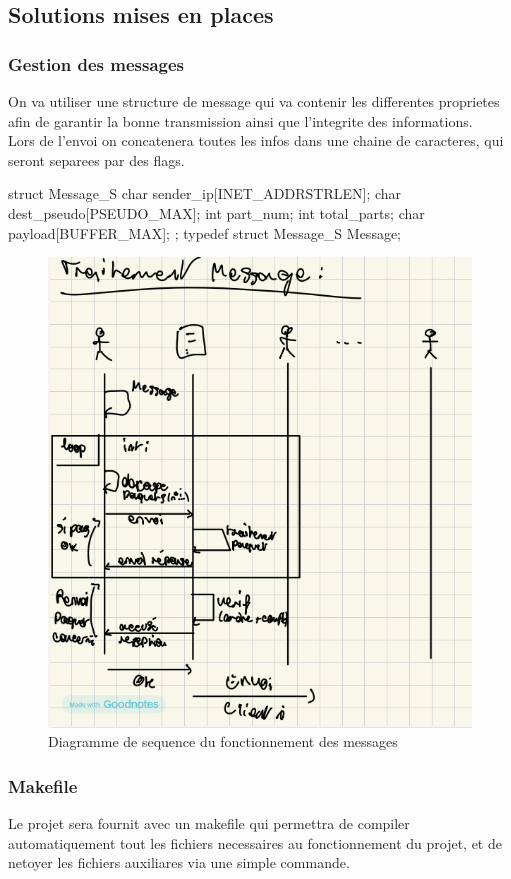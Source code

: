 \documentclass{cs-moi}
\begin{document}
\subsection{Solutions mises en places}
\subsubsection{Gestion des messages}
On va utiliser une structure de message qui va contenir les differentes proprietes afin de garantir la bonne transmission ainsi que l'integrite des informations.\\
Lors de l'envoi on concatenera toutes les infos dans une chaine de caracteres, qui seront separees par des flags.

\begin{C}
    struct Message_S {
        char sender_ip[INET_ADDRSTRLEN];
        char dest_pseudo[PSEUDO_MAX];
        int  part_num;
        int  total_parts;
        char payload[BUFFER_MAX];
    };
    typedef struct Message_S Message;
\end{C}

\begin{figure}[h!]
    \includegraphics[width=0.7\linewidth]{diagMsg.png}
    \caption{Diagramme de sequence du fonctionnement des messages}
    \centering
\end{figure}


\subsubsection{Makefile}
Le projet sera fournit avec un makefile qui permettra de compiler automatiquement tout les fichiers necessaires au fonctionnement du projet, et de netoyer les fichiers auxiliares via une simple commande.\\
\end{document}
